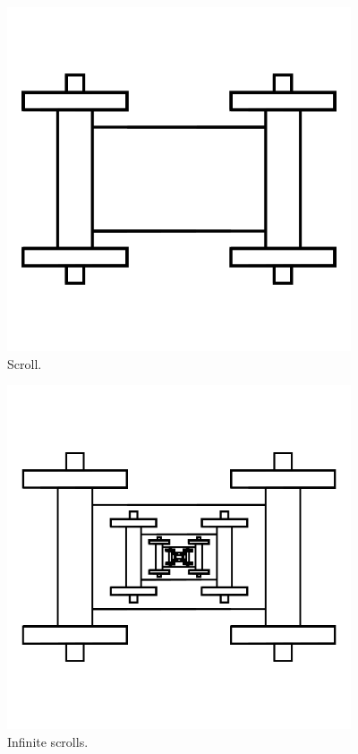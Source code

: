 \begin{figure}
	\centering
	\includegraphics[width=4in]{imageserver/uploadimages/image16.png}
	\caption{Scroll.}
\end{figure}

\begin{figure}
	\centering
	\includegraphics[width=4in]{imageserver/uploadimages/image17.png}
	\caption{Infinite scrolls.}
\end{figure}

